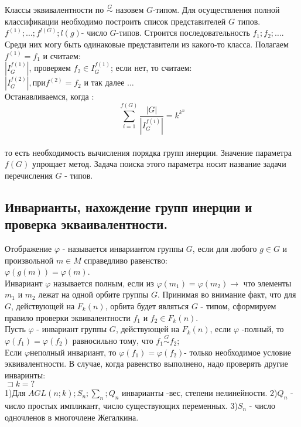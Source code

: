Классы эквивалентности по $\stackrel{G}{\sim}$ назовем $G$-типом. Для осуществления полной классификации необходимо построить список представителей $G$ типов.
$f^{(1)};\dots; f^{l(G)}; l(g)$- число $G$-типов.
Строится последовательность $f_1;f_2;\dots $. Среди них могу быть одинаковые представители из какого-то класса. Полагаем $ f^{(1)}=f_1$ и считаем:\\ 
$|I_G^{f(1)}|$, проверяем $f_2 \in I_G^{f(1)}$; если нет, то считаем:\\
$|I_G^{f(2)}|, при f^{(2)} =f_2$ и так далее $\dots$\\
Останавливаемся, когда :\\
$$ \sum_{i=1}^{f(G)} \frac{|G|}{|I_G^{f(i)}|} = k^{k^n} $$\\ то есть необходимость вычисления порядка групп инерции. Значение параметра $f(G)$ упрощает метод. Задача поиска этого параметра носит название задачи перечисления $G$ - типов.\\

\subsection{Инварианты, нахождение групп инерции и проверка экваивалентности.}

\opr 
Отображение $\varphi$ - называется инвариантом группы $G$, если для любого $g \in G$ и произвольной $m \in M$ справедливо равенство:\\
$\varphi(g(m))=\varphi(m)$.\\
Инвариант $\varphi$ называется полным, если из $\varphi (m_1) = \varphi(m_2) \rightarrow $ что элементы $m_1 $ и $m_2$ лежат на одной орбите группы $G$. Принимая во внимание факт, что для $G$, действующей на $F_k(n)$, орбита будет являться $G$ - типом, сформируем правило проверки эквивалентности $f_1 $ и $f_2 \in F_k(n)$.\\
Пусть $\varphi$ - инвариант группы $G$, действующей на $F_k(n)$, если $\varphi$ -полный, то $\varphi(f_1)=\varphi(f_2) $ равносильно тому, что $f_1 \stackrel{G}{\sim} f_2$;\\
Если $\varphi$неполный инвариант, то $\varphi(f_1)=\varphi(f_2) $- только необходимое условие эквивалентности. В случае, когда равенство выполнено, надо проверять другие инваринты:\\

$\sqsupset k = ?$\\
1)Для $AGL(n;k); S_n; \sum_n; Q_n $ инварианты -вес, степени нелинейности.
2)$Q_n$ - число простых импликант, число существующих переменных.
3)$S_n$ - число одночленов в многочлене Жегалкина.\\


